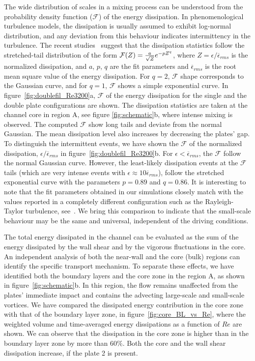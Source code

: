 \documentclass[aps,pre,twocolumn,aps,longbibliography]{revtex4-1}
\begin{document}
	
	The wide distribution of scales in a mixing process can be understood from the probability density function ($\mathcal{F}$) of the energy dissipation. In phenomenological turbulence models, the dissipation is usually assumed to exhibit log-normal distribution, and any deviation from this behaviour indicates intermittency in the turbulence. The recent studies~\cite{lohsearfm,LohseGrossmann1993} suggest that the dissipation statistics follow the stretched-tail distribution of the form $\mathcal{F}(Z)= {a\over{\sqrt{Z}}}e^{-pZ^{q}}$, where $Z = {\epsilon/ {\overline{\epsilon}_{rms}}}$ is the normalized dissipation, and $a$, $p$, $q$ are the fit parameters and $\overline{\epsilon}_{rms}$ is the root mean square value of the energy dissipation. For $q=2$, $\mathcal{F}$ shape corresponds to the Gaussian curve, and for $q=1$, $\mathcal{F}$ shows a simple exponential curve. In figure~\ref{fig:doublefil_Re3200}a, $\mathcal{F}$ of the energy dissipation for the single and the double plate configurations are shown. The dissipation statistics are taken at the channel core in region A, see figure \ref{fig:schematic}b, where intense mixing is observed. The computed $\mathcal{F}$ show long tails and deviate from the normal Gaussian. The mean dissipation level also increases by decreasing the plates' gap. To distinguish the intermittent events, we have shown the $\mathcal{F}$ of the normalized dissipation, ${\epsilon}/\overline{\epsilon}_{rms}$ in figure~\ref{fig:doublefil_Re3200}b. For ${\epsilon}<\overline{\epsilon}_{rms}$, the $\mathcal{F}$ follow the normal Gaussian curve. However, the least-likely dissipation events at the $\mathcal{F}$ tails (which are very intense events with ${\epsilon}\approx 10\overline{\epsilon}_{rms}$), follow the stretched exponential curve with the parameters $p=0.89$ and $q=0.86$. It is interesting to note that the fit parameters obtained in our simulations closely match with the values reported in a completely different configuration such as the Rayleigh-Taylor turbulence, see~\cite{ZhouJiang2013}. We bring this comparison to indicate that the small-scale behaviour may be the same and universal, independent of the driving conditions.
	
	The total energy dissipated in the channel can be evaluated as the sum of the energy dissipated by the wall shear and by the vigorous fluctuations in the core. An independent analysis of both the near-wall and the core (bulk) regions can identify the specific transport mechanism. To separate these effects, we have identified both the boundary layers and the core zone in the region A, as shown in figure~\ref{fig:schematic}b. In this region, the flow remains unaffected from the plates' immediate impact and contains the advecting large-scale and small-scale vortices. We have compared the dissipated energy contribution in the core zone with that of the boundary layer zone, in figure~\ref{fig:core_BL_vs_Re}, where the weighted volume and time-averaged energy dissipations as a function of $Re$ are shown. We can observe that the dissipation in the core zone is higher than in the boundary layer zone by more than $60\%$. Both the core and the wall shear dissipation increase, if the plate 2 is present.
	
\end{document}

